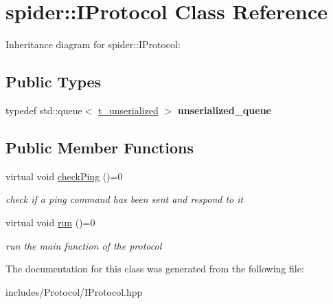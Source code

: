 \hypertarget{classspider_1_1_i_protocol}{}\section{spider\+:\+:I\+Protocol Class Reference}
\label{classspider_1_1_i_protocol}


Inheritance diagram for spider\+:\+:I\+Protocol\+:
\subsection*{Public Types}
\begin{DoxyCompactItemize}
\item 
\mbox{\label{classspider_1_1_i_protocol_a00109c5b9f606e7ab25554df6d6aa863}} 
typedef std\+::queue$<$ \hyperlink{structt__unserialized}{t\+\_\+unserialized} $>$ {\bfseries unserialized\+\_\+queue}
\end{DoxyCompactItemize}
\subsection*{Public Member Functions}
\begin{DoxyCompactItemize}
\item 
\mbox{\label{classspider_1_1_i_protocol_a2b557c3df845ff6a4637a718b4339cce}} 
virtual void \hyperlink{classspider_1_1_i_protocol_a2b557c3df845ff6a4637a718b4339cce}{check\+Ping} ()=0
\begin{DoxyCompactList}\small\item\em check if a ping command has been sent and respond to it \end{DoxyCompactList}\item 
\mbox{\label{classspider_1_1_i_protocol_a7e204667784b17476fe66364d317c623}} 
virtual void \hyperlink{classspider_1_1_i_protocol_a7e204667784b17476fe66364d317c623}{run} ()=0
\begin{DoxyCompactList}\small\item\em run the main function of the protocol \end{DoxyCompactList}\end{DoxyCompactItemize}


The documentation for this class was generated from the following file\+:\begin{DoxyCompactItemize}
\item 
includes/\+Protocol/I\+Protocol.\+hpp\end{DoxyCompactItemize}
